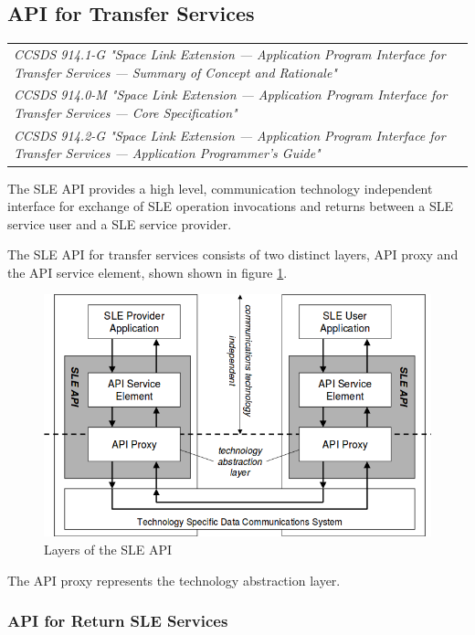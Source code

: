 \subsection{API for Transfer Services}

\begin{tabular}{l}
\textit{CCSDS 914.1-G "Space Link Extension — Application Program Interface for Transfer Services — Summary of Concept and Rationale" \cite{CCSDS-914.1-G}} \\
\textit{CCSDS 914.0-M "Space Link Extension — Application Program Interface for Transfer Services — Core Specification" \cite{CCSDS-914.0-M}} \\
\textit{CCSDS 914.2-G "Space Link Extension — Application Program Interface for Transfer Services — Application Programmer's Guide" \cite{CCSDS-914.2-G}} \\
\end{tabular}

The SLE API provides a high level, communication technology independent interface for exchange of SLE operation invocations and returns between a SLE service user and a SLE service provider. 

The SLE API for transfer services consists of two distinct layers, API proxy and the API service element, shown shown in figure \ref{fig:Layers of the SLE API}.

\begin{figure}[h]
\centering\includegraphics[scale=0.5]{fig/layers_of_the_sle_api}
\caption{Layers of the SLE API}
\label{fig:Layers of the SLE API}
\end{figure}

The API proxy represents the technology abstraction layer. 

\subsubsection{API for Return SLE Services}

